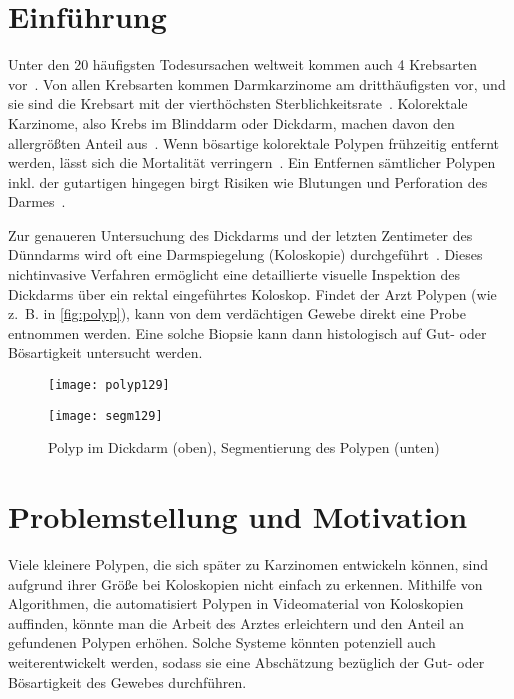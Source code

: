\section{Einführung}

Unter den 20 häufigsten Todesursachen weltweit kommen auch 4 Krebsarten vor~\cite{Lozano.2012}.
Von allen Krebsarten kommen Darmkarzinome am dritthäufigsten vor, und sie sind die Krebsart mit der vierthöchsten Sterblichkeitsrate~\cite{Ferlay.2012}.
Kolorektale Karzinome, also Krebs im Blinddarm oder Dickdarm, machen davon den allergrößten Anteil aus~\cite{Kumar.2005}.
Wenn bösartige kolorektale Polypen frühzeitig entfernt werden, lässt sich die Mortalität verringern~\cite{Zauber.2012}.
Ein Entfernen sämtlicher Polypen inkl. der gutartigen hingegen birgt Risiken wie Blutungen und Perforation des Darmes~\cite{Rex.2009}.

Zur genaueren Untersuchung des Dickdarms und der letzten Zentimeter des Dünndarms wird oft eine Darmspiegelung (Koloskopie) durchgeführt~\cite{Schachschal.2010}.
Dieses nichtinvasive Verfahren ermöglicht eine detaillierte visuelle Inspektion des Dickdarms über ein rektal eingeführtes Koloskop.
Findet der Arzt Polypen (wie z.~B. in \autoref{fig:polyp}), kann von dem verdächtigen Gewebe direkt eine Probe entnommen werden.
Eine solche Biopsie kann dann histologisch auf Gut- oder Bösartigkeit untersucht werden.

\begin{figure}[h]
	\centering
	\texttt{[image: polyp129]}

	\vspace{\baselineskip}

	\texttt{[image: segm129]}
	\caption{Polyp im Dickdarm (oben), Segmentierung des Polypen (unten)}
	\label{fig:polyp}
\end{figure}



\section{Problemstellung und Motivation}

Viele kleinere Polypen, die sich später zu Karzinomen entwickeln können, sind aufgrund ihrer Größe bei Koloskopien nicht einfach zu erkennen.
Mithilfe von Algorithmen, die automatisiert Polypen in Videomaterial von Koloskopien auffinden, könnte man die Arbeit des Arztes erleichtern und den Anteil an gefundenen Polypen erhöhen.
Solche Systeme könnten potenziell auch weiterentwickelt werden, sodass sie eine Abschätzung bezüglich der Gut- oder Bösartigkeit des Gewebes durchführen.

